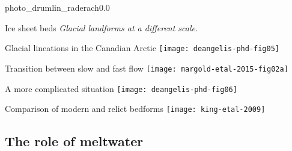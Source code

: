     \begin{backgroundframe}[b]{photo_drumlin_raderach}{0.0}{}
    \end{backgroundframe}



    \begin{sectionframe}{Ice sheet beds}
      \emph{Glacial landforms at a different scale.}
    \end{sectionframe}

    \begin{frame}{Glacial lineations in the Canadian Arctic}
      \texttt{[image: deangelis-phd-fig05]}
    \end{frame}

    \begin{frame}{Transition between slow and fast flow}
      \texttt{[image: margold-etal-2015-fig02a]}
    \end{frame}

    \begin{frame}{A more complicated situation}
      \texttt{[image: deangelis-phd-fig06]}
      \footlineextra{}
    \end{frame}

    \begin{frame}{Comparison of modern and relict bedforms}
      \texttt{[image: king-etal-2009]}
    \end{frame}

\subsection{The role of meltwater}

